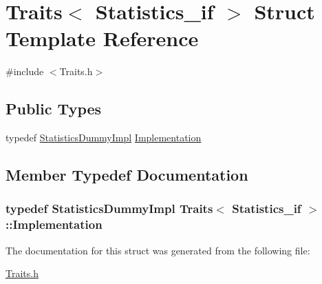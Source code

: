 \hypertarget{struct_traits_3_01_statistics__if_01_4}{}\section{Traits$<$ Statistics\+\_\+if $>$ Struct Template Reference}
\label{struct_traits_3_01_statistics__if_01_4}


{\ttfamily \#include $<$Traits.\+h$>$}

\subsection*{Public Types}
\begin{DoxyCompactItemize}
\item 
typedef \hyperlink{class_statistics_dummy_impl}{Statistics\+Dummy\+Impl} \hyperlink{struct_traits_3_01_statistics__if_01_4_abce13a8c09bd9a16ea17ce128f08440b}{Implementation}
\end{DoxyCompactItemize}


\subsection{Member Typedef Documentation}
\subsubsection[{\texorpdfstring{Implementation}{Implementation}}]{\setlength{\rightskip}{0pt plus 5cm}typedef {\bf Statistics\+Dummy\+Impl} {\bf Traits}$<$ {\bf Statistics\+\_\+if} $>$\+::{\bf Implementation}}\hypertarget{struct_traits_3_01_statistics__if_01_4_abce13a8c09bd9a16ea17ce128f08440b}{}\label{struct_traits_3_01_statistics__if_01_4_abce13a8c09bd9a16ea17ce128f08440b}


The documentation for this struct was generated from the following file\+:\begin{DoxyCompactItemize}
\item 
\hyperlink{_traits_8h}{Traits.\+h}\end{DoxyCompactItemize}
